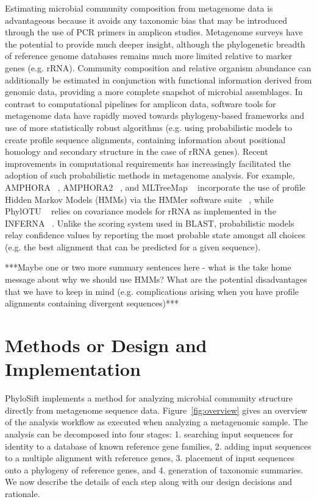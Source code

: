 \documentclass[10pt]{article}
\begin{document}
Estimating microbial community composition from metagenome data is advantageous because it avoids any taxonomic bias that may be introduced through the use of PCR primers in amplicon studies. 
Metagenome surveys have the potential to provide much deeper insight, although the phylogenetic breadth of reference genome databases remains much more limited relative to marker genes (e.g. rRNA). 
Community composition and relative organism abundance can additionally be estimated in conjunction with functional information derived from genomic data, providing a more complete snapshot of microbial assemblages. 
In contrast to computational pipelines for amplicon data, software tools for metagenome data have rapidly moved towards phylogeny-based frameworks and use of more statistically robust algorithms (e.g. using probabilistic models to create profile sequence alignments, containing information about positional homology and secondary structure in the case of rRNA genes). 
Recent improvements in computational requirements has increasingly facilitated the adoption of such probabilistic methods in metagenome analysis.
For example, AMPHORA ~\cite{WuEisen2008}, AMPHORA2 ~\cite{Wu2012}, and MLTreeMap ~\cite{Stark2010} incorporate the use of profile Hidden Markov Models (HMMs) via the HMMer software suite ~\cite{Eddy2011}, while PhylOTU ~\cite{Sharpton2011} relies on covariance models for rRNA as implemented in the INFERNA ~\cite{Nawrocki2009}. 
Unlike the scoring system used in BLAST, probabilistic models relay confidence values by reporting the most probable state amongst all choices (e.g. the best alignment that can be predicted for a given sequence). 

***Maybe one or two more summary sentences here - what is the take home message about why we should use HMMs? What are the potential disadvantages that we have to keep in mind (e.g. complications arising when you have profile alignments containing divergent sequences)***




\section*{Methods or Design and Implementation}

PhyloSift implements a method for analyzing microbial community structure directly from metagenome sequence data.
Figure~\ref{fig:overview} gives an overview of the analysis workflow as executed when analyzing a metagenomic sample.
The analysis can be decomposed into four stages: 1. searching input sequences for identity to a database of known reference gene families, 2. adding input sequences to a multiple alignment with reference genes, 3. placement of input sequences onto a phylogeny of reference genes, and 4. generation of taxonomic summaries. We now describe the details of each step along with our design decisions and rationale.
 
\end{document}
